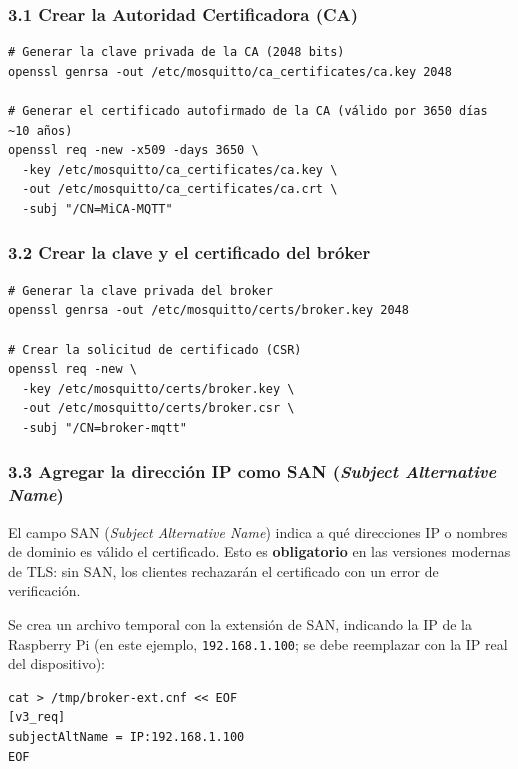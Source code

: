\documentclass[12pt,a4paper]{article}
\begin{document}
\subsubsection{3.1 Crear la Autoridad Certificadora (CA)}

\begin{lstlisting}[style=bash]
# Generar la clave privada de la CA (2048 bits)
openssl genrsa -out /etc/mosquitto/ca_certificates/ca.key 2048

# Generar el certificado autofirmado de la CA (válido por 3650 días ~10 años)
openssl req -new -x509 -days 3650 \
  -key /etc/mosquitto/ca_certificates/ca.key \
  -out /etc/mosquitto/ca_certificates/ca.crt \
  -subj "/CN=MiCA-MQTT"
\end{lstlisting}

\subsubsection{3.2 Crear la clave y el certificado del bróker}

\begin{lstlisting}[style=bash]
# Generar la clave privada del broker
openssl genrsa -out /etc/mosquitto/certs/broker.key 2048

# Crear la solicitud de certificado (CSR)
openssl req -new \
  -key /etc/mosquitto/certs/broker.key \
  -out /etc/mosquitto/certs/broker.csr \
  -subj "/CN=broker-mqtt"
\end{lstlisting}

\subsubsection{3.3 Agregar la dirección IP como SAN (\textit{Subject Alternative Name})}

El campo SAN (\textit{Subject Alternative Name}) indica a qué direcciones IP o
nombres de dominio es válido el certificado. Esto es \textbf{obligatorio} en
las versiones modernas de TLS: sin SAN, los clientes rechazarán el certificado
con un error de verificación.

Se crea un archivo temporal con la extensión de SAN, indicando la IP de la
Raspberry Pi (en este ejemplo, \texttt{192.168.1.100}; se debe reemplazar con
la IP real del dispositivo):

\begin{lstlisting}[style=bash]
cat > /tmp/broker-ext.cnf << EOF
[v3_req]
subjectAltName = IP:192.168.1.100
EOF
\end{lstlisting}
\end{document}
